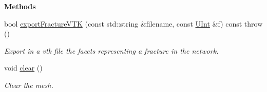 \begin{Indent}{\bf Methods}
\begin{DoxyCompactItemize}
bool \hyperlink{classFVCode3D_1_1Mesh3D_a076fb54969f3922a67bf26e7bf0fd8be}{export\+Fracture\+V\+TK} (const std\+::string \&filename, const \hyperlink{namespaceFVCode3D_a4bf7e328c75d0fd504050d040ebe9eda}{U\+Int} \&f) const   throw ()
\begin{DoxyCompactList}\small\item\em Export in a vtk file the facets representing a fracture in the network. \end{DoxyCompactList}\item 
void \hyperlink{classFVCode3D_1_1Mesh3D_a1789482a87137f0c47a2dd9a1e302d66}{clear} ()
\begin{DoxyCompactList}\small\item\em Clear the mesh. \end{DoxyCompactList}\end{DoxyCompactItemize}
\end{Indent}
